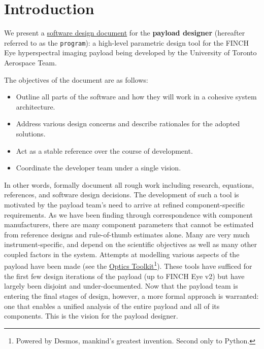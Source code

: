 \documentclass{article}
\begin{document}




\tableofcontents
\newpage

\section{Introduction}
We present a \href{https://en.wikipedia.org/wiki/Software_design_description}{software design document} for the \textbf{payload designer} (hereafter referred to as the \texttt{program}): a high-level parametric design tool for the FINCH Eye hyperspectral imaging payload being developed by the University of Toronto Aerospace Team.

The objectives of the document are as follows:
\begin{itemize}
    \item Outline all parts of the software and how they will work in a cohesive system architecture.
    \item Address various design concerns and describe rationales for the adopted solutions.
    \item Act as a stable reference over the course of development.
    \item Coordinate the developer team under a single vision.
\end{itemize}

In other words, formally document all rough work including research, equations, references, and software design decisions. The development of such a tool is motivated by the payload team's need to arrive at refined component-specific requirements. As we have been finding through correspondence with component manufacturers, there are many component parameters that cannot be estimated from reference designs and rule-of-thumb estimates alone. Many are very much instrument-specific, and depend on the scientific objectives as well as many other coupled factors in the system. Attempts at modelling various aspects of the payload have been made (see the \href{http://spacesys.utat.ca/confluence/x/NoFmAQ}{Optics Toolkit}\footnote{Powered by Desmos, mankind's greatest invention. Second only to Python.}). These tools have sufficed for the first few design iterations of the payload (up to FINCH Eye v2) but have largely been disjoint and under-documented. Now that the payload team is entering the final stages of design, however, a more formal approach is warranted: one that enables a unified analysis of the entire payload and all of its components. This is the vision for the payload designer.
\end{document}
